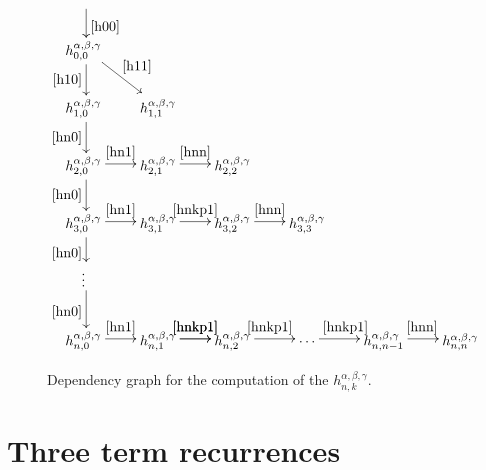 \documentclass{article}
\numberwithin{equation}{section}
\numberwithin{figure}{section}
\begin{document}
\begin{figure}
%
\begin{equation*}
\xymatrix @-0.2pc {
\ar@<2pt>[d]^{\eqref{h00}}\\
h^{\alpha,\beta,\gamma}_{0,0} \ar@<2pt>[d]_{\eqref{h10}} \ar@<2pt>[rd]^{\eqref{h11}}\\
h^{\alpha,\beta,\gamma}_{1,0} \ar@<2pt>[d]_{\eqref{hn0}} & h^{\alpha,\beta,\gamma}_{1,1}\\
h^{\alpha,\beta,\gamma}_{2,0} \ar@<2pt>[d]_{\eqref{hn0}} \ar@<2pt>[r]^{\eqref{hn1}} & h^{\alpha,\beta,\gamma}_{2,1} \ar@<2pt>[r]^{\eqref{hnn}} & h^{\alpha,\beta,\gamma}_{2,2}\\
h^{\alpha,\beta,\gamma}_{3,0} \ar@<2pt>[d]_{\eqref{hn0}} \ar@<2pt>[r]^{\eqref{hn1}} & h^{\alpha,\beta,\gamma}_{3,1} \ar@<2pt>[r]^{\eqref{hnkp1}} & h^{\alpha,\beta,\gamma}_{3,2} \ar@<2pt>[r]^{\eqref{hnn}} & h^{\alpha,\beta,\gamma}_{3,3}\\
\vdots \ar@<2pt>[d]_{\eqref{hn0}}\\
h^{\alpha,\beta,\gamma}_{n,0} \ar@<2pt>[r]^{\eqref{hn1}} & h^{\alpha,\beta,\gamma}_{n,1} \ar@<2pt>[r]^{\eqref{hnkp1}} \ar@<2pt>[r]^{\eqref{hnkp1}} & h^{\alpha,\beta,\gamma}_{n,2} \ar@<2pt>[r]^{\eqref{hnkp1}} & \cdots \ar@<2pt>[r]^{\eqref{hnkp1}} & h^{\alpha,\beta,\gamma}_{n,n-1} \ar@<2pt>[r]^{\eqref{hnn}} & h^{\alpha,\beta,\gamma}_{n,n}
}
\end{equation*}
%
\caption{Dependency graph for the computation of the $h^{\alpha,\beta,\gamma}_{n,k}$.}
\label{fig:trianglePolynomialComputationGraph}
\end{figure}

\section{Three term recurrences}
\end{document}
